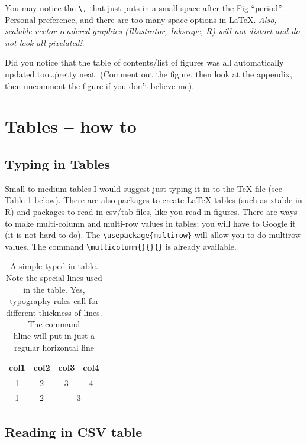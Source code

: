 You may notice the \verb+\,+ that just puts in a small space after the Fig ``period''. Personal preference, and there are too many space options in \LaTeX{}. \emph{Also, scalable vector rendered graphics (Illustrator, Inkscape, R) will not distort and do not look all pixelated!}. 

Did you notice that the table of contents/list of figures was all automatically updated too\ldots\.pretty neat. (Comment out the figure, then look at the appendix, then uncomment the figure if you don't believe me). 


\section{Tables -- how to}

\subsection{Typing in Tables}
Small to medium tables I would suggest just typing it in to the \TeX{} file (see Table \ref{simpleTable} below). There are also packages to create \LaTeX{} tables (such as xtable in R) and packages to read in csv/tab files, like you read in figures. There are ways to make multi-column and multi-row values in tables; you will have to Google it (it is not hard to do). The \verb+\usepackage{multirow}+ will allow you to do multirow values. The command \verb+\multicolumn{}{}{}+ is already available. 

\begin{table}[h]
\centering
\caption[Simple table]{A simple typed in table. Note the special lines used in the table. Yes, typography rules call for different thickness of lines. The command \\hline will put in just a regular horizontal line}
\label{simpleTable}
\begin{tabular}{c|ccc} %
\toprule
col1 & col2 & col3 & col4 \\
\midrule
1 & 2 & 3 & 4 \\
1 & 2 & \multicolumn{2}{c}{3} \\
\bottomrule
\end{tabular}
\end{table}



\subsection{Reading in CSV table}

